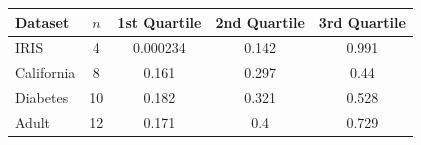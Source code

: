 \begin{tabular}{lcccc}
    \toprule
    Dataset & $n$ & 1st Quartile & 2nd Quartile & 3rd Quartile \\
    \midrule
    IRIS & 4 & 0.000234 & 0.142 & 0.991 \\
    California & 8 & 0.161 & 0.297 & 0.44 \\
    Diabetes & 10 & 0.182 & 0.321 & 0.528 \\
    Adult & 12 & 0.171 & 0.4 & 0.729 \\
    \bottomrule
\end{tabular}
